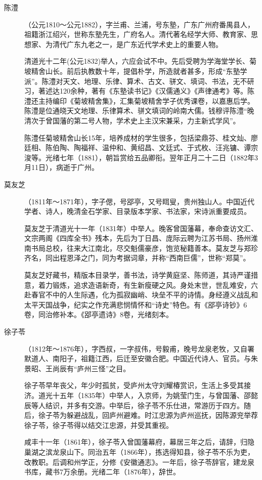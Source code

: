 \begin{description}
  \item[陈澧] （公元1810～公元1882），字兰甫、兰浦，号东塾，广东广州府番禺县人，祖籍浙江绍兴，世称东塾先生，广府名人。清代著名经学大师、教育家、思想家、为清代广东九老之一，是广东近代学术史上的重要人物。\par
        清道光十二年(公元1832)举人，六应会试不中。先后受聘为学海堂学长、菊坡精舍山长。前后执教数十年，提倡朴学，所造就者甚多，形成“东塾学派”。陈澧对天文、地理、乐律、算术、古文、骈文、填词、书法，无不研习，著述达120余种，著有《东塾读书记》《汉儒通义》《声律通考》等。陈澧还主持编印《菊坡精舍集》，汇集菊坡精舍学子优秀课卷，以嘉惠后学。陈澧是位通晓天文地理、乐律算术、骈文填词的岭南大儒。钱穆评陈澧“晚清次于曾国藩的第二号人物，学术史上主汉宋兼采，力主新式学风”。\par
        陈澧任菊坡精舍山长15年，培养成材的学生很多，包括梁鼎芬、桂文灿、廖廷相、陈伯陶、陶福祥、温仲和、黄绍昌、文廷式、于式枚、汪兆镛、谭宗浚等。光绪七年（1881），朝旨赏给五品卿衔。翌年正月二十二日（1882年3月11日），病逝于广州。
  \item[莫友芝] （1811年～1871年），字子偲，号郘亭，又号眲叟，贵州独山人。中国近代学者、诗人，晚清金石学家、目录版本学家、书法家，宋诗派重要成员。\par
        莫友芝于清道光十一年（1831年）中举人。晚客曾国藩幕，奉命查访文汇、文宗两阁《四库全书》残本，先后为丁日昌、庞际云聘为江苏书局、扬州淮南书局总校，往来大江南北，尽交魁儒豪彦，饱览秘籍善本。莫友芝与郑珍齐名，同出程恩泽之门，同为考据词章，并称“西南巨儒”，世称“郑莫”。\par
        莫友芝好藏书，精版本目录学，善书法，诗学黄庭坚、陈师道，其诗严谨措意，着力锻炼，追求造语新奇，有生新瘦硬之风。身处末世，世乱难安，六赴春官不中的人生际遇，化为孤寂幽峭、块垒不平的诗情。身经遵义战乱和太平天国战争，纪实之作充满悲悯情怀和“诗史”特色。有《郘亭诗钞》6卷，同治修补本。《郘亭遗诗》8卷，光绪刻本。
  \item[徐子苓] （1812年～1876年），字西叔，一字叔伟，号毅甫，晚号龙泉老牧，又自署默道人、南阳子，祖籍江西，后迁至安徽合肥。中国近代诗人、官员。与朱景昭、王尚辰有“庐州三怪”之目。\par
        徐子苓早年丧父，年少时孤贫，受庐州太守刘耀椿赏识，生活上多受其接济。道光十五年（1835年）中举人，入京师，为姚莹门生，与曾国藩、邵懿辰等人结识，并多有交游。中举后，徐子苓不乐仕进，常游历于四方。随后，徐子苓为躲避战乱，回庐州避难。时江忠源为庐州巡抚，因陈源兖举荐徐子苓，徐子苓得以结交江忠源，并受其重视。\par
        咸丰十一年（1861年），徐子苓入曾国藩幕府，幕居三年之后，请辞，归隐巢湖之滨龙泉山下。同治五年（1866年），拣选得知县，徐子苓不乐为吏，改教职。后调和州学正，分修《安徽通志》。一年后，徐子苓辞官，建龙泉书库，藏书7万余册。光绪二年（1876年），辞世。

\end{description}
